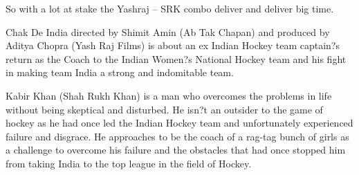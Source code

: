 \documentclass[11pt]{article}
\begin{document}
So with a lot at stake the Yashraj – SRK combo deliver and deliver big time.

Chak De India directed by Shimit Amin (Ab Tak Chapan) and produced by Aditya Chopra (Yash Raj Films) is about an ex Indian Hockey team captain?s return as the Coach to the Indian Women?s National Hockey team and his fight in making team India a strong and indomitable team.

Kabir Khan (Shah Rukh Khan) is a man who overcomes the problems in life without being skeptical and disturbed. He isn?t an outsider to the game of hockey as he had once led the Indian Hockey team and unfortunately experienced failure and disgrace. He approaches to be the coach of a rag-tag bunch of girls as a challenge to overcome his failure and the obstacles that had once stopped him from taking India to the top league in the field of Hockey.
\end{document}
